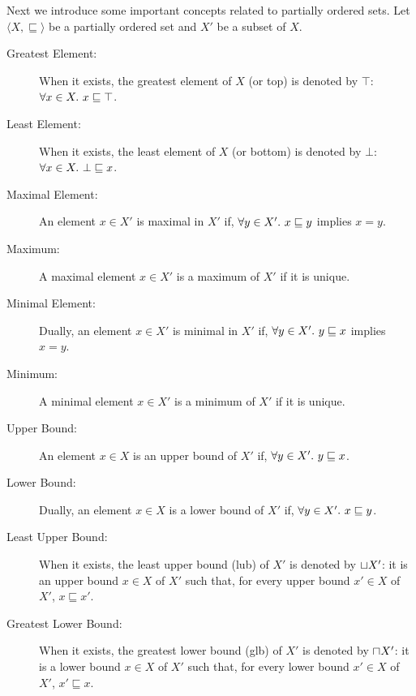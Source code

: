 Next we introduce some important concepts related to partially ordered sets.
Let $\langle X, \sqsubseteq \rangle$ be a partially ordered set and $X'$ be a subset of $X$.
\begin{description}
  \item[Greatest Element:] When it exists, the greatest element of $X$ (or top) is denoted by $\top$: $\forall x \in X.~ x \sqsubseteq \top$.
  \item[Least Element:] When it exists, the least element of $X$ (or bottom) is denoted by $\bot$: $\forall x \in X.~ \bot \sqsubseteq x$.
  \item[Maximal Element:] An element $x \in X'$ is maximal in $X'$ if, $\forall y \in X'.~ x \sqsubseteq y$ implies $x = y$.
  \item[Maximum:] A maximal element $x \in X'$ is a maximum of $X'$ if it is unique.
  \item[Minimal Element:] Dually, an element $x \in X'$ is minimal in $X'$ if, $\forall y \in X'.~ y \sqsubseteq x$ implies $x = y$.
  \item[Minimum:] A minimal element $x \in X'$ is a minimum of $X'$ if it is unique.
  \item[Upper Bound:] An element $x \in X$ is an upper bound of $X'$ if, $\forall y \in X'.~ y \sqsubseteq x$.
  \item[Lower Bound:] Dually, an element $x \in X$ is a lower bound of $X'$ if, $\forall y \in X'.~ x \sqsubseteq y$.
  \item[Least Upper Bound:] When it exists, the least upper bound (lub) of $X'$ is denoted by $\sqcup X'$: it is an upper bound $x \in X$ of $X'$ such that, for every upper bound $x' \in X$ of $X'$, $x \sqsubseteq x'$.
  \item[Greatest Lower Bound:] When it exists, the greatest lower bound (glb) of $X'$ is denoted by $\sqcap X'$: it is a lower bound $x \in X$ of $X'$ such that, for every lower bound $x' \in X$ of $X'$, $x' \sqsubseteq x$.
\end{description}

